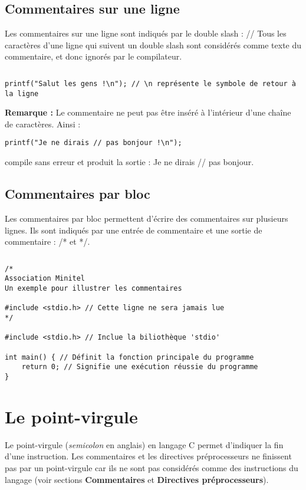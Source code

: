 \documentclass[../../../main.tex]{subfiles}
\begin{document}
\subsection{Commentaires sur une ligne}
Les commentaires sur une ligne sont indiqués par le double slash : \textsf{//} \newline
Tous les caractères d'une ligne qui suivent un double slash sont considérés comme texte du commentaire, et donc ignorés par le compilateur.
\begin{lstlisting}[title=Exemple]
\end{lstlisting}
\begin{verbatim}
printf("Salut les gens !\n"); // \n représente le symbole de retour à la ligne
\end{verbatim}
\textbf{Remarque :} Le commentaire ne peut pas être inséré à l'intérieur d'une chaîne de caractères. Ainsi :
\begin{verbatim}
printf("Je ne dirais // pas bonjour !\n");
\end{verbatim}
compile sans erreur et produit la sortie : \textsf{Je ne dirais // pas bonjour}.
\subsection{Commentaires par bloc}
Les commentaires par bloc permettent d'écrire des commentaires sur plusieurs lignes. Ils sont indiqués par une entrée de commentaire et une sortie de commentaire : \textsf{/*} et \textsf{*/}.
\begin{lstlisting}[title=Exemple]
\end{lstlisting}
\begin{verbatim}
/*
Association Minitel
Un exemple pour illustrer les commentaires

#include <stdio.h> // Cette ligne ne sera jamais lue
*/

#include <stdio.h> // Inclue la biliothèque 'stdio'

int main() { // Définit la fonction principale du programme
	return 0; // Signifie une exécution réussie du programme
}
\end{verbatim}
\section{Le point-virgule}
Le point-virgule (\textit{semicolon} en anglais) en langage C permet d'indiquer la fin d'une instruction. Les commentaires et les directives préprocesseurs ne finissent pas par un point-virgule car ils ne sont pas considérés comme des instructions du langage (voir sections \textbf{Commentaires} et \textbf{Directives préprocesseurs}).
 
\end{document}
